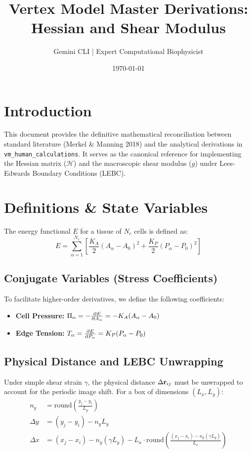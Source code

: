 \documentclass[12pt]{article}
\title{Vertex Model Master Derivations: Hessian and Shear Modulus}
\author{Gemini CLI | Expert Computational Biophysicist}
\date{\today}
\begin{document}
\maketitle

\section{Introduction}
This document provides the definitive mathematical reconciliation between standard literature (Merkel \& Manning 2018) and the analytical derivations in \texttt{vm\_human\_calculations}. It serves as the canonical reference for implementing the Hessian matrix ($\mathcal{H}$) and the macroscopic shear modulus ($g$) under Lees-Edwards Boundary Conditions (LEBC).

\section{Definitions \& State Variables}

The energy functional $E$ for a tissue of $N_c$ cells is defined as:
\begin{equation}
    E = \sum_{\alpha=1}^{N_c} \left[ \frac{K_A}{2}(A_\alpha - A_0)^2 + \frac{K_P}{2}(P_\alpha - P_0)^2 \right]
\end{equation}

\subsection{Conjugate Variables (Stress Coefficients)}
To facilitate higher-order derivatives, we define the following coefficients:
\begin{itemize}
    \item \textbf{Cell Pressure:} $\Pi_\alpha = -\pdv{E}{A_\alpha} = -K_A(A_\alpha - A_0)$
    \item \textbf{Edge Tension:} $T_\alpha = \pdv{E}{P_\alpha} = K_P(P_\alpha - P_0)$
\end{itemize}

\subsection{Physical Distance and LEBC Unwrapping}
Under simple shear strain $\gamma$, the physical distance $\Delta \vb{r}_{ij}$ must be unwrapped to account for the periodic image shift. For a box of dimensions $(L_x, L_y)$:
\begin{align}
    n_y &= \text{round}\left(\frac{y_j - y_i}{L_y}\right) \\
    \Delta y &= (y_j - y_i) - n_y L_y \\
    \Delta x &= (x_j - x_i) - n_y(\gamma L_y) - L_x \cdot \text{round}\left(\frac{(x_j - x_i) - n_y(\gamma L_y)}{L_x}\right)
\end{align}
\end{document}
